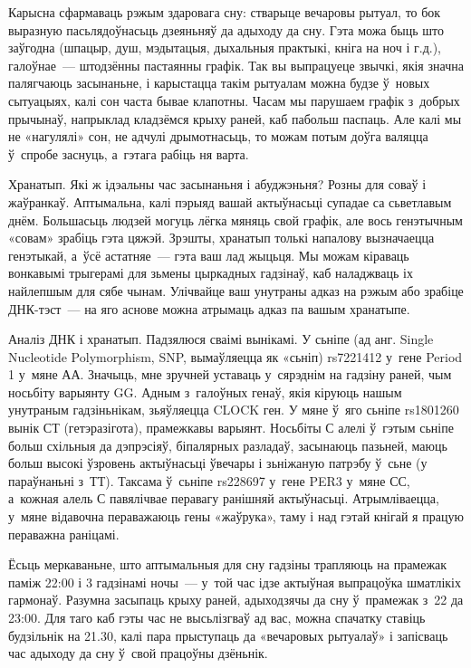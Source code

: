 Карысна сфармаваць рэжым здаровага сну: стварыце вечаровы рытуал, то бок выразную пасьлядоўнасьць дзеяньняў да адыходу да сну. Гэта можа быць што заўгодна (шпацыр, душ, мэдытацыя, дыхальныя практыкі, кніга на ноч і г.д.), галоўнае~--- штодзённы пастаянны графік. Так вы выпрацуеце звычкі, якія значна палягчаюць засынаньне, і карыстацца такім рытуалам можна будзе ў~новых сытуацыях, калі сон часта бывае клапотны. Часам мы парушаем графік з~добрых прычынаў, напрыклад кладзёмся крыху раней, каб пабольш паспаць. Але калі мы не «нагулялі» сон, не адчулі дрымотнасьць, то можам потым доўга валяцца ў~спробе заснуць, а~гэтага рабіць ня варта.

Хранатып. Які ж ідэальны час засынаньня і абуджэньня? Розны для соваў і жаўранкаў. Аптымальна, калі пэрыяд вашай актыўнасьці супадае са сьветлавым днём. Большасьць людзей могуць лёгка мяняць свой графік, але вось генэтычным «совам» зрабіць гэта цяжэй. Зрэшты, хранатып толькі напалову вызначаецца генэтыкай, а~ўсё астатняе~--- гэта ваш лад жыцьця. Мы можам кіраваць вонкавымі трыгерамі для зьмены цыркадных гадзінаў, каб наладжваць іх найлепшым для сябе чынам. Улічвайце ваш унутраны адказ на рэжым або зрабіце ДНК-тэст~--- на яго аснове можна атрымаць адказ па вашым хранатыпе.

Аналіз ДНК і хранатып. Падзялюся сваімі вынікамі. У сьніпе (ад анг. Single Nucleotide Polymorphism, SNP, вымаўляецца як «сьніп) rs7221412 у~гене Period 1 у~мяне АА. Значыць, мне зручней уставаць у~сярэднім на гадзіну раней, чым носьбіту варыянту GG. Адным з~галоўных генаў, якія кіруюць нашым унутраным гадзіньнікам, зьяўляецца CLOCK ген. У мяне ў~яго сьніпе rs1801260 вынік СТ (гетэразігота), прамежкавы варыянт. Носьбіты С алелі ў~гэтым сьніпе больш схільныя да дэпрэсіяў, біпалярных разладаў, засынаюць пазьней, маюць больш высокі ўзровень актыўнасьці ўвечары і зьніжаную патрэбу ў~сьне (у параўнаньні з~ТТ). Таксама ў~сьніпе rs228697 у~гене PER3 у~мяне СС, а~кожная алель С павялічвае перавагу ранішняй актыўнасьці. Атрымліваецца, у~мяне відавочна пераважаюць гены «жаўрука», таму і над гэтай кнігай я працую пераважна раніцамі.

Ёсьць меркаваньне, што аптымальныя для сну гадзіны трапляюць на прамежак паміж 22:00 і 3 гадзінамі ночы~--- у~той час ідзе актыўная выпрацоўка шматлікіх гармонаў. Разумна засыпаць крыху раней, адыходзячы да сну ў~прамежак з~22 да 23:00. Для таго каб гэты час не высьлізгваў ад вас, можна спачатку ставіць будзільнік на 21.30, калі пара прыступаць да «вечаровых рытуалаў» і запісваць час адыходу да сну ў~свой працоўны дзёньнік.

